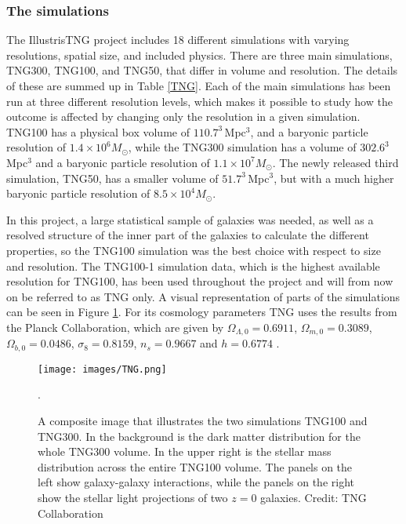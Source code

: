 \subsubsection{The simulations}
The IllustrisTNG project includes 18 different simulations with varying resolutions, spatial size, and included physics. There are three main simulations, TNG300, TNG100, and TNG50, that differ in volume and resolution. The details of these are summed up in Table \ref{TNG}. Each of the main simulations has been run at three different resolution levels, which makes it possible to study how the outcome is affected by changing only the resolution in a given simulation. TNG100 has a physical box volume of $110.7^3 \, $Mpc$^3$, and a baryonic particle resolution of $1.4 \times 10^6 M_{\odot}$, while the TNG300 simulation has a volume of $302.6^3 \, $Mpc$^3$ and a baryonic particle resolution of $1.1 \times 10^7 M_{\odot}$. The newly released third simulation, TNG50, has a smaller volume of $51.7^3 \, $Mpc$^3$, but with a much higher baryonic particle resolution of $8.5 \times 10^4 M_{\odot}$. 

In this project, a large statistical sample of galaxies was needed, as well as a resolved structure of the inner part of the galaxies to calculate the different properties, so the TNG100 simulation was the best choice with respect to size and resolution. The TNG100-1 simulation data, which is the highest available resolution for TNG100, has been used throughout the project and will from now on be referred to as TNG only. A visual representation of parts of the simulations can be seen in Figure \ref{tng_illustration}. For its cosmology parameters TNG uses the results from the Planck Collaboration, which are given by $\Omega_{\Lambda,0} = 0.6911$, $\Omega_{m,0}=0.3089$, $\Omega_{b,0}=0.0486$, $\sigma_8=0.8159$, $n_s=0.9667$ and $h = 0.6774$ \parencite{Planck2016}.

\begin{figure}
    \centering
    \texttt{[image: images/TNG.png]}
    \caption{A composite image that illustrates the two simulations TNG100 and TNG300. In the background is the dark matter distribution for the whole TNG300 volume. In the upper right is the stellar mass distribution across the entire TNG100 volume. The panels on the left show galaxy-galaxy interactions, while the panels on the right show the stellar light projections of two $z=0$ galaxies. Credit: TNG Collaboration}.
    \label{tng_illustration}
\end{figure}

